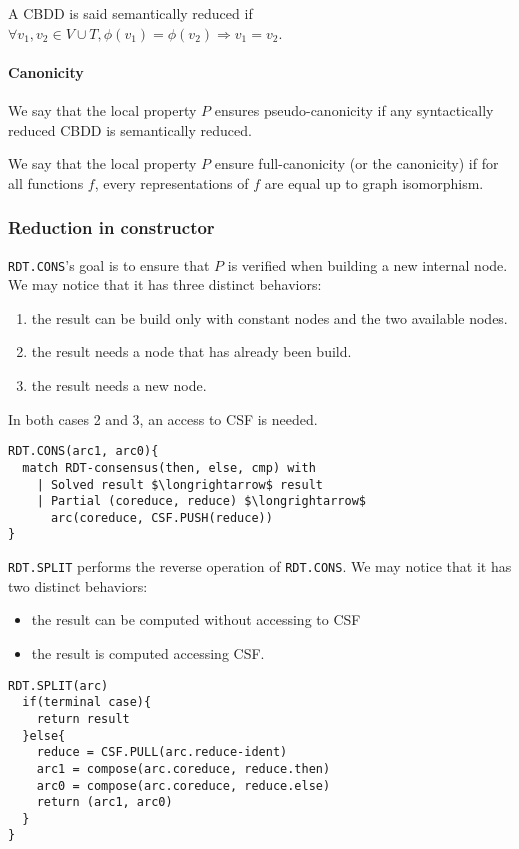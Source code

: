 \documentclass[a4paper,10pt]{article}
\begin{document}
A CBDD is said semantically reduced if $\forall v_1, v_2 \in V\cup T, \phi(v_1)=\phi(v_2) \Rightarrow v_1 = v_2$.

\paragraph{Canonicity}


We say that the local property $P$ ensures pseudo-canonicity if any syntactically reduced CBDD is semantically reduced.


We say that the local property $P$ ensure full-canonicity (or the canonicity) if for all functions $f$, every representations of $f$ are equal up to graph isomorphism.


\subsubsection{Reduction in constructor}

\texttt{RDT.CONS}'s goal is to ensure that $P$ is verified when building a new internal node.
We may notice that it has three distinct behaviors:\begin{enumerate}
  \item the result can be build only with constant nodes and the two available nodes.
  \item the result needs a node that has already been build.
  \item the result needs a new node.
\end{enumerate}
In both cases 2 and 3, an access to CSF is needed.

\begin{lstlisting}
RDT.CONS(arc1, arc0){
  match RDT-consensus(then, else, cmp) with
    | Solved result $\longrightarrow$ result
    | Partial (coreduce, reduce) $\longrightarrow$
      arc(coreduce, CSF.PUSH(reduce))
}
\end{lstlisting}

\texttt{RDT.SPLIT} performs the reverse operation of \texttt{RDT.CONS}. We may notice that it has two distinct behaviors:\begin{itemize}
  \item the result can be computed without accessing to CSF
  \item the result is computed accessing CSF.
\end{itemize}

\begin{lstlisting}
RDT.SPLIT(arc)
  if(terminal case){
    return result
  }else{
    reduce = CSF.PULL(arc.reduce-ident)
    arc1 = compose(arc.coreduce, reduce.then)
    arc0 = compose(arc.coreduce, reduce.else)
    return (arc1, arc0)
  }
}
\end{lstlisting}
\end{document}
